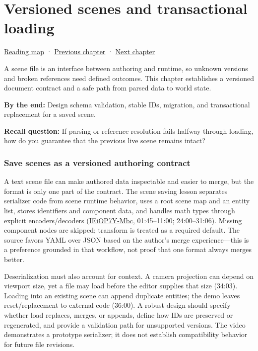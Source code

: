\chapter{Versioned scenes and transactional loading}\label{06-engine-ii-ch033-versioned-scenes-and-transactional-loading}\hypertarget{06-engine-ii-ch033}{}\label{stagechapter:06-engine-ii-ch033}

\hypertarget{06-engine-ii-ch033-versioned-scenes-and-transactional-loading}{}

\hyperref[volume-reading-map]{Reading map} · \hyperref[06-engine-ii-ch031]{Previous chapter} · \hyperref[06-engine-ii-ch034-rigid-body-motion-from-forces-to-contact]{Next chapter}

A scene file is an interface between authoring and runtime, so unknown versions and broken references need defined outcomes. This chapter establishes a versioned document contract and a safe path from parsed data to world state.

\textbf{By the end:} Design schema validation, stable IDs, migration, and transactional replacement for a saved scene.

\textbf{Recall question:} If parsing or reference resolution fails halfway through loading, how do you guarantee that the previous live scene remains intact?

\subsection{Save scenes as a versioned authoring contract}\label{06-engine-ii-ch033-save-scenes-as-a-versioned-authoring-contract}

\hypertarget{06-engine-ii-ch033-save-scenes-as-a-versioned-authoring-contract}{}

A text scene file can make authored data inspectable and easier to merge, but the format is only one part of the contract. The scene saving lesson separates serializer code from scene runtime behavior, uses a root scene map and an entity list, stores identifiers and component data, and handles math types through explicit encoders/decoders (\href{https://www.youtube.com/watch?v=IEiOP7Y-Mbc}{IEiOP7Y-Mbc}, 01:45--11:00; 24:00--31:06). Missing component nodes are skipped; transform is treated as a required default. The source favors YAML over JSON based on the author's merge experience---this is a preference grounded in that workflow, not proof that one format always merges better.

Deserialization must also account for context. A camera projection can depend on viewport size, yet a file may load before the editor supplies that size (34:03). Loading into an existing scene can append duplicate entities; the demo leaves reset/replacement to external code (36:00). A robust design should specify whether load replaces, merges, or appends, define how IDs are preserved or regenerated, and provide a validation path for unsupported versions. The video demonstrates a prototype serializer; it does not establish compatibility behavior for future file revisions.

